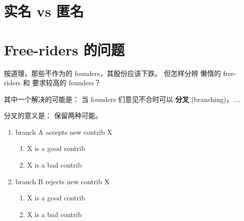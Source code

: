 \documentclass[12pt, orivec]{article}
\newcommand{\cc}[2]{#1}
\newcommand{\cc}[2]{#2}
\begin{document}
\cc{}{
\begin{itemize}
	\item A company's \textbf{stock prices} are determined externally by the free-market (``invisible hand'')

	\item How the company distributes its \textbf{shares} are decided internally;  This is where COCO tries to innovate.
\end{itemize}
}

\section{\cc{实名 vs 匿名}{Real-name vs anonymity}}



\section{\cc{Free-riders 的问题}{The problem of free-riders}}

\cc{
按道理，那些不作为的 founders，其股份应该下跌。  但怎样分辨 懒惰的 free-riders 和 要求较高的 founders？
}{
In principle, if a founder hoards shares without performing useful work, his shares in the company should be reduced.	 But how could we distinguish between lazy free-riders and someone who has high standards for other people's work?
}

\cc{
其中一个解决的可能是： 当 founders 们意见不合时可以 \textbf{分叉} (branching)，....
}{
A possible solution is via \textbf{branching} when founders disagree with each other.
}

\cc{
分叉的意义是： 保留两种可能。 
}{
The essence of branching is:  to preserve both options in a disagreement.
}

\begin{enumerate}
	\item branch A accepts new contrib X
	\begin{enumerate}
		\item X is a good contrib
		\item X is a bad contrib
	\end{enumerate}
	\item branch B rejects new contrib X
	\begin{enumerate}
		\item X is a good contrib
		\item X is a bad contrib
	\end{enumerate}
\end{enumerate}
\end{document}
